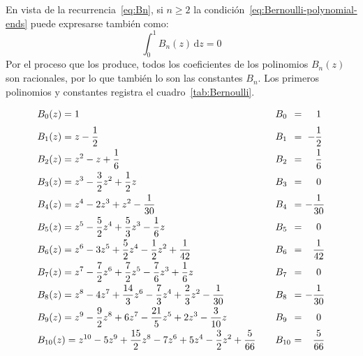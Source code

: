   En vista de la recurrencia~\eqref{eq:Bn},%
  si \(n \ge 2\) la condición~\eqref{eq:Bernoulli-polynomial-ends}
  puede expresarse también como:%
  \begin{equation}
    \label{eq:Bernoulli-polynomial-integral}
    \int_0^1 B_n(z) \, \mathrm{d} z = 0
  \end{equation}
  Por el proceso que los produce,
  todos los coeficientes
  de los polinomios \(B_n(z)\) son racionales,
  por lo que también lo son las constantes \(B_n\).
  Los primeros polinomios y constantes
  registra el cuadro~\ref{tab:Bernoulli}.
  \begin{table}[htbp]
    \centering
    \begin{align*}
      \begin{array}{l@{\hspace*{2em}}l@{${} = {}$}c}
	\displaystyle
	  B_0(z) = 1 &
	  B_0 & \displaystyle \phantom{-}1 \\[1.5ex]
	\displaystyle
	  B_1(z) = z - \frac{1}{2} &
	  B_1 & \displaystyle -\frac{1}{2} \\[1.5ex]
	\displaystyle
	  B_2(z) = z^2 - z + \frac{1}{6} &
	  B_2 & \displaystyle \phantom{-}\frac{1}{6} \\[1.5ex]
	\displaystyle
	  B_3(z) = z^3 - \frac{3}{2} z^2 + \frac{1}{2} z &
	  B_3 & \displaystyle \phantom{-}0 \\[1.5ex]
	\displaystyle
	  B_4(z) = z^4 - 2 z^3 + z^2 - \frac{1}{30} &
	  B_4 & \displaystyle -\frac{1}{30} \\[1.5ex]
	\displaystyle
	  B_5(z) = z^5 - \frac{5}{2} z^4 + \frac{5}{3} z^3
		    - \frac{1}{6} z &
	  B_5 & \displaystyle \phantom{-}0 \\[1.5ex]
	\displaystyle
	  B_6(z) = z^6 - 3 z^5 + \frac{5}{2} z^4 - \frac{1}{2} z^2
		    + \frac{1}{42} &
	  B_6 & \displaystyle \phantom{-}\frac{1}{42} \\[1.5ex]
	\displaystyle
	  B_7(z) = z^7 - \frac{7}{2} z^6 + \frac{7}{2} z^5
		    - \frac{7}{6} z^3 + \frac{1}{6} z &
	  B_7 & \displaystyle \phantom{-}0 \\[1.5ex]
	\displaystyle
	  B_8(z) = z^8 - 4 z^7 + \frac{14}{3} z^6 - \frac{7}{3} z^4
		    + \frac{2}{3} z^2 - \frac{1}{30} &
	  B_8 & \displaystyle -\frac{1}{30} \\[1.5ex]
	\displaystyle
	  B_9(z) = z^9 - \frac{9}{2} z^8 + 6 z^7 - \frac{21}{5} z^5
		    + 2 z^3 -\frac{3}{10} z &
	  B_9 &	 \displaystyle \phantom{-}0 \\[1.5ex]
	\displaystyle
	  B_{10}(z) = z^{10} - 5 z^9 + \frac{15}{2} z^8
		    - 7 z^6 + 5 z^4 - \frac{3}{2} z^2
		    + \frac{5}{66} &
	  B_{10} &  \displaystyle \phantom{-} \frac{5}{66}
      \end{array}
    \end{align*}
    \caption[Polinomios y números de Bernoulli]
	    {Polinomios y números de Bernoulli~\cite{DLMF}}
    \label{tab:Bernoulli}
  \end{table}
